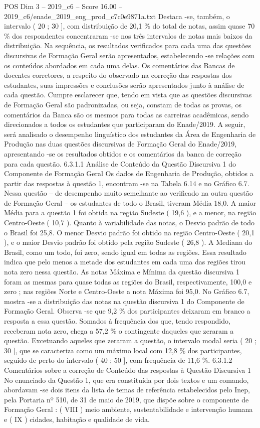 \begin{textsample}{POS Dim 3 – 2019\_c6 – Score 16.00 – 2019\_c6/enade\_2019\_eng\_prod\_c7c0e9871a.txt}
Destaca -se, também, o intervalo ( 20 ; 30 ], com distribuição de 20,1 \% do total de notas, assim quase 70 \% dos respondentes concentraram -se nos três intervalos de notas mais baixos da distribuição.
Na sequência, os resultados verificados para cada uma das questões discursivas de Formação Geral serão apresentados, estabelecendo -se relações com os conteúdos abordados em cada uma delas.
Os comentários das Bancas de docentes corretores, a respeito do observado na correção das respostas dos estudantes, suas impressões e conclusões serão apresentados junto à análise de cada questão.
Cumpre esclarecer que, tendo em vista que as questões discursivas de Formação Geral são padronizadas, ou seja, constam de todas as provas, os comentários da Banca são os mesmos para todas as carreiras acadêmicas, sendo direcionados a todos os estudantes que participaram do Enade/2019.
A seguir, será analisado o desempenho linguístico dos estudantes da Área de Engenharia de Produção nas duas questões discursivas de Formação Geral do Enade/2019, apresentando -se os resultados obtidos e os comentários da banca de correção para cada questão. 6.3.1.1 Análise de Conteúdo da Questão Discursiva 1 do Componente de Formação Geral Os dados de Engenharia de Produção, obtidos a partir das respostas à questão 1, encontram -se na Tabela 6.14 e no Gráfico 6.7.
Nessa questão – de desempenho muito semelhante ao verificado na outra questão de Formação Geral – os estudantes de todo o Brasil, tiveram Média 18,0.
A maior Média para a questão 1 foi obtida na região Sudeste ( 19,6 ), e a menor, na região Centro-Oeste ( 10,7 ).
Quanto à variabilidade das notas, o Desvio padrão de todo o Brasil foi 25,8.
O menor Desvio padrão foi obtido na região Centro-Oeste ( 20,1 ), e o maior Desvio padrão foi obtido pela região Sudeste ( 26,8 ).
A Mediana do Brasil, como um todo, foi zero, sendo igual em todas as regiões.
Essa resultado indica que pelo menos a metade dos estudantes em cada uma das regiões tirou nota zero nessa questão.
As notas Máxima e Mínima da questão discursiva 1 foram as mesmas para quase todas as regiões do Brasil, respectivamente, 100,0 e zero ; nas regiões Norte e Centro-Oeste a nota Máxima foi 95,0.
No Gráfico 6.7, mostra -se a distribuição das notas na questão discursiva 1 do Componente de Formação Geral.
Observa -se que 9,2 \% dos participantes deixaram em branco a resposta a essa questão.
Somados à frequência dos que, tendo respondido, receberam nota zero, chega a 57,2 \% o contingente daqueles que zeraram a questão.
Excetuando aqueles que zeraram a questão, o intervalo modal seria ( 20 ; 30 ], que se caracteriza como um máximo local com 12,8 \% dos participantes, seguido de perto do intervalo ( 40 ; 50 ], com frequência de 11,6 \%. 6.3.1.2 Comentários sobre a correção de Conteúdo das respostas à Questão Discursiva 1 No enunciado da Questão 1, que era constituída por dois textos e um comando, abordavam -se dois itens da lista de temas de referência estabelecidos pelo Inep, pela Portaria nº 510, de 31 de maio de 2019, que dispõe sobre o componente de Formação Geral : ( VIII ) meio ambiente, sustentabilidade e intervenção humana e ( IX ) cidades, habitação e qualidade de vida.

\end{textsample}
